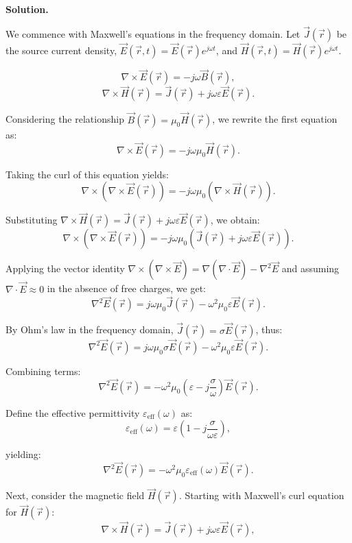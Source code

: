 \documentclass[12pt, a4paper, oneside]{report}
\newenvironment{solution}{
  \par\medskip\noindent
  \textbf{Solution.}\quad\itshape
  \par\noindent\makebox[\linewidth]{\rule{\textwidth}{0.4pt}}
}{
  \par\noindent\makebox[\linewidth]{\rule{\textwidth}{0.4pt}}
  \par\medskip
}
\begin{document}
\begin{solution}
We commence with Maxwell's equations in the frequency domain. Let \(\vec{J}(\vec{r})\) be the source current density, \(\vec{E}(\vec{r}, t) = \vec{E}(\vec{r}) e^{j\omega t}\), and \(\vec{H}(\vec{r}, t) = \vec{H}(\vec{r}) e^{j\omega t}\).

\[
\nabla \times \vec{E}(\vec{r}) = -j\omega \vec{B}(\vec{r}),
\]
\[
\nabla \times \vec{H}(\vec{r}) = \vec{J}(\vec{r}) + j\omega \varepsilon \vec{E}(\vec{r}).
\]

Considering the relationship \(\vec{B}(\vec{r}) = \mu_0 \vec{H}(\vec{r})\), we rewrite the first equation as:
\[
\nabla \times \vec{E}(\vec{r}) = -j\omega \mu_0 \vec{H}(\vec{r}).
\]

Taking the curl of this equation yields:
\[
\nabla \times (\nabla \times \vec{E}(\vec{r})) = -j\omega \mu_0 (\nabla \times \vec{H}(\vec{r})).
\]

Substituting \(\nabla \times \vec{H}(\vec{r}) = \vec{J}(\vec{r}) + j\omega \varepsilon \vec{E}(\vec{r})\), we obtain:
\[
\nabla \times (\nabla \times \vec{E}(\vec{r})) = -j\omega \mu_0 (\vec{J}(\vec{r}) + j\omega \varepsilon \vec{E}(\vec{r})).
\]

Applying the vector identity \(\nabla \times (\nabla \times \vec{E}) = \nabla (\nabla \cdot \vec{E}) - \nabla^2 \vec{E}\) and assuming \(\nabla \cdot \vec{E} \approx 0\) in the absence of free charges, we get:
\[
\nabla^2 \vec{E}(\vec{r}) = j\omega \mu_0 \vec{J}(\vec{r}) - \omega^2 \mu_0 \varepsilon \vec{E}(\vec{r}).
\]

By Ohm's law in the frequency domain, \(\vec{J}(\vec{r}) = \sigma \vec{E}(\vec{r})\), thus:
\[
\nabla^2 \vec{E}(\vec{r}) = j\omega \mu_0 \sigma \vec{E}(\vec{r}) - \omega^2 \mu_0 \varepsilon \vec{E}(\vec{r}).
\]

Combining terms:
\[
\nabla^2 \vec{E}(\vec{r}) = -\omega^2 \mu_0 \left( \varepsilon - j\frac{\sigma}{\omega} \right) \vec{E}(\vec{r}).
\]

Define the effective permittivity \(\varepsilon_{\text{eff}}(\omega)\) as:
\[
\varepsilon_{\text{eff}}(\omega) = \varepsilon \left(1 - j \frac{\sigma}{\omega \varepsilon} \right),
\]

yielding:
\[
\nabla^2 \vec{E}(\vec{r}) = -\omega^2 \mu_0 \varepsilon_{\text{eff}}(\omega) \vec{E}(\vec{r}).
\]

Next, consider the magnetic field \(\vec{H}(\vec{r})\). Starting with Maxwell's curl equation for \(\vec{H}(\vec{r})\):
\[
\nabla \times \vec{H}(\vec{r}) = \vec{J}(\vec{r}) + j\omega \varepsilon \vec{E}(\vec{r}),
\]


\end{solution}
\end{document}

